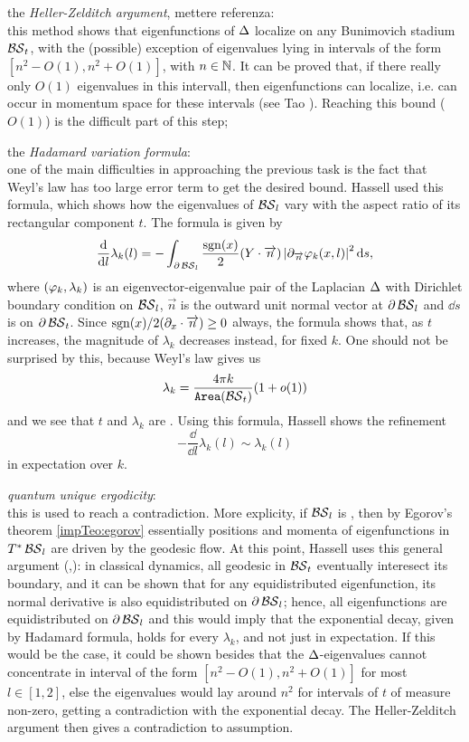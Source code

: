 \begin{compactitem}
\item the \emph{Heller-Zelditch argument}, mettere referenza:\\ 
this method shows that eigenfunctions of $\operatorname{\Delta}$ localize on any Bunimovich stadium $\operatorname{\mathcal{BS}}_{t}$, with the (possible) exception of eigenvalues lying in intervals of the form $[n^{2}-O(1),n^{2}+O(1)]$, with $n\in\mathbb{N}$. It can be proved that, if there really only $O(1)$ eigenvalues in this intervall, then eigenfunctions can localize, i.e.  can occur in momentum space for these intervals (see Tao \cite{tao:site}). Reaching this bound ($O(1)$) is the difficult part of this step; 
\item the \emph{Hadamard variation formula}:\\
one of the main difficulties in approaching the previous task is the fact that Weyl's law has too large error term to get the desired bound. Hassell used this formula, which shows how the eigenvalues of $\operatorname{\mathcal{BS}}_{l}$ vary with the aspect ratio of its rectangular component $t$. The formula is given by
\[
\frac{\mathop{}\!\mathrm{d} }{\mathop{}\!\mathrm{d} l}\lambda_{k}(l)=-\int_{\partial\operatorname{\mathcal{BS}}_{l}}\frac{\operatorname{sgn}(x)}{2}(Y\cdot\overrightarrow{n})\left| \partial_{\overrightarrow{n}}\varphi_{k}(x,l)\right|^{2}\mathop{}\!\mathrm{d} s,
\]
where $(\varphi_{k},\lambda_{k})$ is an eigenvector-eigenvalue pair of the Laplacian $\operatorname{\Delta}$ with Dirichlet boundary condition on $\operatorname{\mathcal{BS}}_{l}$, $\overrightarrow{n}$ is the outward unit normal vector at $\partial\operatorname{\mathcal{BS}}_{l}$ and $\dd s$ is  on $\partial\operatorname{\mathcal{BS}}_{t}$. Since $\operatorname{sgn}(x)/2(\partial_{x}\cdot\overrightarrow{n})\geq0$ always, the formula shows that, as $t$ increases, the magnitude of $\lambda_{k}$ decreases instead, for fixed $k$. One should not be surprised by this, because Weyl's law gives us 
\[
\lambda_{k}=\frac{4\pi k}{\operatorname{\mathtt{Area}}(\operatorname{\mathcal{BS}}_{t})}(1+o(1))
\]
and we see that $t$ and $\lambda_{k}$ are . Using this formula, Hassell shows the refinement
\[
-\frac{\dd}{\dd l}\lambda_{k}(l)\sim \lambda_{k}(l)
\]
in expectation over $k$.
\item \emph{quantum unique ergodicity}:\\
this is used to reach a contradiction. More explicity, if $\operatorname{\mathcal{BS}}_{l}$ is \QUE, then by Egorov's theorem \ref{impTeo:egorov} essentially positions and momenta of eigenfunctions in $T^{\ast}\operatorname{\mathcal{BS}}_{l}$ are driven by the geodesic flow. At this point, Hassell uses this general argument (\cite{tao:site},\cite{Hass:billiards_not}): in classical dynamics, all geodesic in $\operatorname{\mathcal{BS}}_{t}$ eventually interesect its boundary, and it can be shown that for any equidistributed eigenfunction, its normal derivative is also equidistributed on $\partial\operatorname{\mathcal{BS}}_{l}$; hence, all eigenfunctions are equidistributed on $\partial\operatorname{\mathcal{BS}}_{l}$ and this would imply that the exponential decay, given by Hadamard formula, holds for every $\lambda_{k}$, and not just in expectation. If this would be the case, it could be shown besides that the $\operatorname{\Delta}$-eigenvalues cannot concentrate in interval of the form $[n^{2}-O(1),n^{2}+O(1)]$ for most $l\in [1,2]$, else the eigenvalues would lay around $n^{2}$ for intervals of $t$ of measure non-zero, getting a contradiction with the exponential decay. The Heller-Zelditch argument then gives a contradiction to \QUE assumption.

\end{compactitem}
